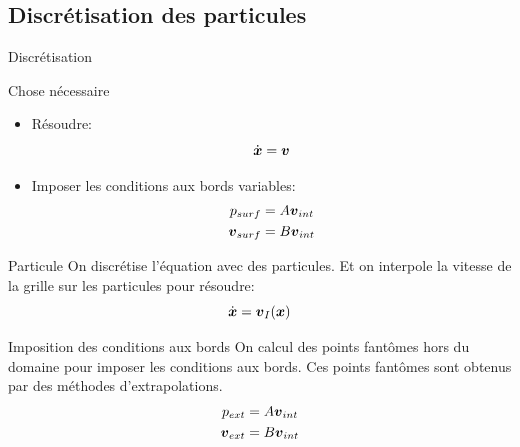 \subsection{Discrétisation des particules}
\begin{frame}[<+->][shrink]{Discrétisation}

\begin{block}{Chose nécessaire}
 \begin{itemize}
  \item<0-> Résoudre:
  \begin{equation*}
   \dot{{\boldsymbol {x}}}={\boldsymbol {v}}
  \end{equation*}
  \item Imposer les conditions aux bords variables:
   \begin{align*}
 p_{surf}&=A{\boldsymbol {v}}_{int}\\
 {\boldsymbol {v}}_{surf}&=B{\boldsymbol {v}}_{int}
\end{align*}
 \end{itemize}

\end{block}

\begin{block}{Particule}
 On discrétise l'équation avec des particules.
 Et on interpole la vitesse de la grille sur les particules pour résoudre:
   \begin{equation*}
   \dot{{\boldsymbol {x}}}={\boldsymbol {v}}_{I}({\boldsymbol {x}})
  \end{equation*}
\end{block}
\begin{block}{Imposition des conditions aux bords}
On calcul des points fantômes hors du domaine pour imposer les conditions aux bords.
Ces points fantômes sont obtenus par des méthodes d'extrapolations.
\begin{align*}
 p_{ext}&=A{\boldsymbol {v}}_{int}\\
 {\boldsymbol {v}}_{ext}&=B{\boldsymbol {v}}_{int}
\end{align*}
\end{block}

\end{frame}

